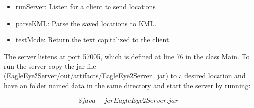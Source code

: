 \begin{itemize} \itemsep1pt \parskip0pt 
  \item runServer: Listen for a client to send locations
  \item parseKML: Parse the saved locations to KML.
  \item testMode: Return the text capitalized to the client.
\end{itemize}

The server listens at port 57005, which is defined at line 76 in the class Main. To run the server copy the jar-file (EagleEye2Server/out/artifacts/EagleEye2Server\_jar) to a desired location and have an folder named data in the same directory and start the server by running:

\[
\$ java -jar EagleEye2Server.jar 
\]